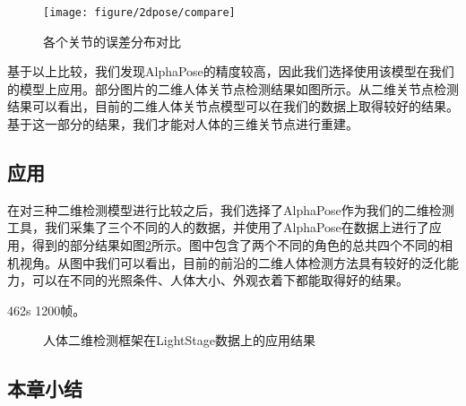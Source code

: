 \begin{figure}[htbp]
    \centering
    \texttt{[image: figure/2dpose/compare]}
    \caption{\label{fig:2d-loss} 各个关节的误差分布对比}
\end{figure}

基于以上比较，我们发现AlphaPose的精度较高，因此我们选择使用该模型在我们的模型上应用。部分图片的二维人体关节点检测结果如图所示。从二维关节点检测结果可以看出，目前的二维人体关节点模型可以在我们的数据上取得较好的结果。基于这一部分的结果，我们才能对人体的三维关节点进行重建。


\subsection{应用}
在对三种二维检测模型进行比较之后，我们选择了AlphaPose作为我们的二维检测工具，我们采集了三个不同的人的数据，并使用了AlphaPose在数据上进行了应用，得到的部分结果如图\ref{fig:ls2d}所示。图中包含了两个不同的角色的总共四个不同的相机视角。从图中我们可以看出，目前的前沿的二维人体检测方法具有较好的泛化能力，可以在不同的光照条件、人体大小、外观衣着下都能取得好的结果。

462s 1200帧。

\begin{figure}[htbp]
    \centering
    \caption{人体二维检测框架在LightStage数据上的应用结果\label{fig:ls2d}}
\end{figure}


\subsection{本章小结}
